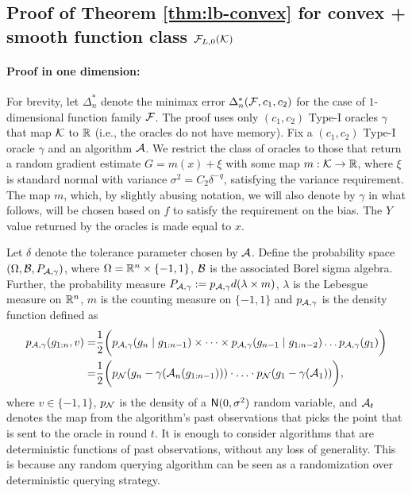 \subsection{Proof of Theorem \ref{thm:lb-convex} for convex + smooth function class $\mathcal{F}_{L,0}(\mathcal{K})$}
\label{sec:appendix-lbconvex}
\paragraph{Proof in one dimension:}
For brevity, let $\Delta_n^{*}$ denote the minimax error $\Delta_n^*(\mathcal{F}, c_1,c_2)$ for the case of $1$-dimensional function family $\mathcal{F}$.
The proof uses only $(c_1,c_2)$ Type-I oracles $\gamma$ that map $\mathcal{K}$ to $\mathbb{R}$ (i.e., the oracles do not have memory).
Fix a  $(c_1,c_2)$ Type-I oracle $\gamma$ and an algorithm $\mathcal{A}$.
We restrict the class of oracles to those that return a random gradient estimate $G = m(x) + \xi$ with some map $m: \mathcal{K} \to \mathbb{R}$,
where $\xi$ is standard normal with variance $\sigma^2 = C_2 \delta^{-q}$, satisfying the variance requirement. 
The map $m$, which, by slightly abusing notation, we will also denote by $\gamma$ in what follows, will be chosen based on $f$ to satisfy the requirement on the bias. The $Y$ value returned by the oracles is made equal to $x$.

Let $\delta$ denote the tolerance parameter chosen by $\mathcal{A}$.
Define the probability space $(\Omega, \mathcal{B}, P_{\mathcal{A},\gamma})$, 
where $\Omega = \mathbb{R}^n\times \{-1,1\}$, $\mathcal{B}$ is the associated Borel sigma algebra. 
Further, the probability measure $P_{\mathcal{A},\gamma} := p_{\mathcal{A},\gamma} d(\lambda \times m)$, 
	$\lambda$ is the Lebesgue measure on $\mathbb{R}^n$, 
	$m$ is the counting measure on $\{-1,1\}$ and 
	$p_{\mathcal{A},\gamma}$ is the density function defined as
\begin{align*}
p_{\mathcal{A},\gamma}(g_{1:n}, v) = &\dfrac{1}{2} \bigg(p_{\mathcal{A},\gamma}(g_n \mid g_{1:n-1})\times \dots \times p_{\mathcal{A},\gamma }(g_{n-1} \mid g_{1:n-2}) \ldots p_{\mathcal{A},\gamma}(g_1)\bigg)\\
 = & \dfrac{1}{2} \bigg( p_{\mathcal{N}}(g_n - \gamma(\mathcal{A}_n(g_{1:n-1}))) \cdot
 \ldots \cdot  p_{\mathcal{N}}(g_1 - \gamma(\mathcal{A}_1))\bigg),
\end{align*}
where $v\in\{-1,1\}$, $p_{\mathcal{N}}$ is the density of a $\mathsf{N}(0,\sigma^2)$ random variable,
and $\mathcal{A}_t$ denotes the map from the algorithm's past observations
that picks the point that is sent to the oracle in round $t$.
It is enough to consider algorithms that are deterministic functions of past observations, without any loss of generality. This is because any random querying algorithm can be seen as a randomization over deterministic querying strategy.

